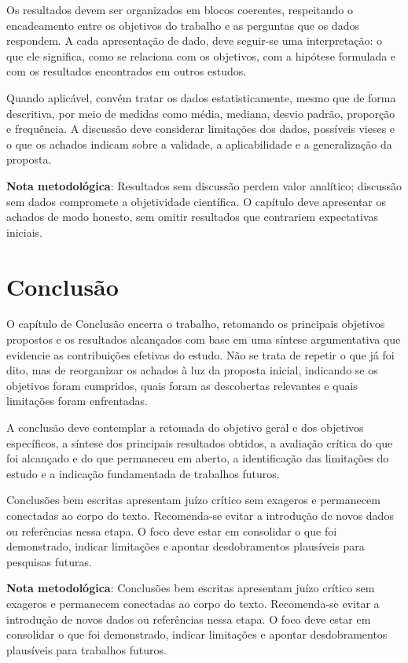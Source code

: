 \documentclass{eic-bcc-tcc}
\begin{document}
Os resultados devem ser organizados em blocos coerentes, respeitando o encadeamento entre os objetivos do trabalho e as perguntas que os dados respondem. A cada apresentação de dado, deve seguir-se uma interpretação: o que ele significa, como se relaciona com os objetivos, com a hipótese formulada e com os resultados encontrados em outros estudos.

Quando aplicável, convém tratar os dados estatisticamente, mesmo que de forma descritiva, por meio de medidas como média, mediana, desvio padrão, proporção e frequência. A discussão deve considerar limitações dos dados, possíveis vieses e o que os achados indicam sobre a validade, a aplicabilidade e a generalização da proposta.

\textbf{Nota metodológica}: Resultados sem discussão perdem valor analítico; discussão sem dados compromete a objetividade científica. O capítulo deve apresentar os achados de modo honesto, sem omitir resultados que contrariem expectativas iniciais.


\chapter{Conclusão}
\label{cha:conclusao}

O capítulo de Conclusão encerra o trabalho, retomando os principais objetivos propostos e os resultados alcançados com base em uma síntese argumentativa que evidencie as contribuições efetivas do estudo. Não se trata de repetir o que já foi dito, mas de reorganizar os achados à luz da proposta inicial, indicando se os objetivos foram cumpridos, quais foram as descobertas relevantes e quais limitações foram enfrentadas.

A conclusão deve contemplar a retomada do objetivo geral e dos objetivos específicos, a síntese dos principais resultados obtidos, a avaliação crítica do que foi alcançado e do que permaneceu em aberto, a identificação das limitações do estudo e a indicação fundamentada de trabalhos futuros.

Conclusões bem escritas apresentam juízo crítico sem exageros e permanecem conectadas ao corpo do texto. Recomenda-se evitar a introdução de novos dados ou referências nessa etapa. O foco deve estar em consolidar o que foi demonstrado, indicar limitações e apontar desdobramentos plausíveis para pesquisas futuras.

\textbf{Nota metodológica}: Conclusões bem escritas apresentam juízo crítico sem exageros e permanecem conectadas ao corpo do texto. Recomenda-se evitar a introdução de novos dados ou referências nessa etapa. O foco deve estar em consolidar o que foi demonstrado, indicar limitações e apontar desdobramentos plausíveis para trabalhos futuros.
\end{document}
